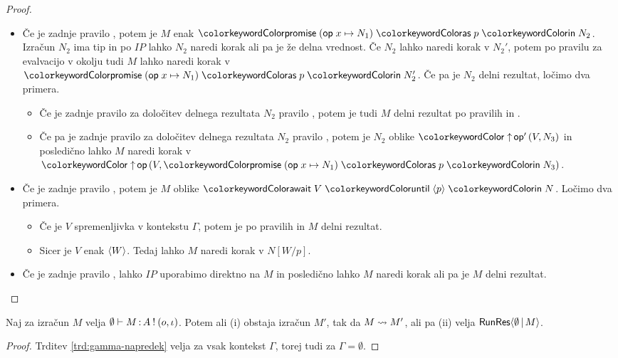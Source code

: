 \begin{proof}
\begin{itemize}
		
		\item Če je zadnje pravilo , potem je $M$ enak $\tmwith{op}{x}{N_1}{p}{N_2}$. Izračun $N_2$ ima tip in po $IP$ lahko $N_2$ naredi korak ali pa je že delna vrednost. Če $N_2$ lahko naredi korak v $N_2'$, potem po pravilu za evalvacijo v okolju tudi $M$ lahko naredi korak v $\tmwith{op}{x}{N_1}{p}{N_2'}$.
		Če pa je $N_2$ delni rezultat, ločimo dva primera.
		\begin{itemize}
			\item Če je zadnje pravilo za določitev delnega rezultata $N_2$ pravilo , potem je tudi $M$ delni rezultat po pravilih  in .
			\item Če pa je zadnje pravilo za določitev delnega rezultata $N_2$ pravilo , potem je $N_2$ oblike $\tmopout{op'}{V}{N_3}$ in posledično lahko $M$ naredi korak v $\tmopout{op}{V}{\tmwith{op}{x}{N_1}{p}{N_3}}$.
		\end{itemize}
		 
		
		\item Če je zadnje pravilo , potem je $M$ oblike $\tmawait{V}{p}{N}$.
		Ločimo dva primera.
		\begin{itemize}
			\item Če je $V$ spremenljivka v kontekstu $\Gamma$, potem je po pravilih  in  $M$ delni rezultat.
			\item Sicer je $V$ enak $\langle W \rangle$. Tedaj lahko $M$ naredi korak v $N[W/p]$.
		\end{itemize}
		
		\item Če je zadnje pravilo , lahko $IP$ uporabimo direktno na $M$ in posledično lahko $M$ naredi korak ali pa je $M$ delni rezultat.
			
	\end{itemize}
	
\end{proof}


\begin{posledica}[o napredku]\label{pos:prazen-napredek}
	Naj za izračun $M$ velja $\emptyset \vdash M \mathinner{:} A \mathbin{!} (o, \iota)$. Potem ali (i) obstaja izračun $M'$, tak da $M \leadsto M'$, ali pa (ii) velja $\mathsf{RunRes}\langle\emptyset \,\vert\, M\rangle$.
\end{posledica}

\begin{proof}
	Trditev \ref{trd:gamma-napredek} velja za vsak kontekst $\Gamma$, torej tudi za $\Gamma = \emptyset$.
\end{proof}


